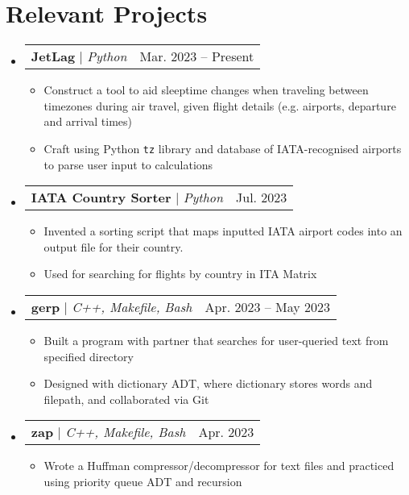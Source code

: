 \documentclass[letterpaper,11pt]{article}
\makeatletter
\newcommand{\resumeItem}[1]{
  \item\small{
    {#1 \vspace{-2pt}}
  }
}
\newcommand{\resumeProjectHeading}[2]{
    \item
    \begin{tabular*}{0.97\textwidth}{l@{\extracolsep{\fill}}r}
      \small#1 & #2 \\
    \end{tabular*}\vspace{-7pt}
}
\newcommand{\resumeSubHeadingListStart}{\begin{itemize}[leftmargin=0in, label={}]}
\newcommand{\resumeSubHeadingListEnd}{\end{itemize}}
\newcommand{\resumeItemListStart}{\begin{itemize}}
\newcommand{\resumeItemListEnd}{\end{itemize}\vspace{-5pt}}
\makeatother
\begin{document}
\section{Relevant Projects}
    \resumeSubHeadingListStart
    \resumeProjectHeading
          {\textbf{JetLag} $|$ \emph{Python}}{Mar. 2023 – Present}
          \resumeItemListStart
            \resumeItem{Construct a tool to aid sleeptime changes when traveling between timezones during air travel,
            given flight details (e.g. airports, departure and arrival
            times)}
            \resumeItem{Craft using Python \texttt{tz} library and database of IATA-recognised airports to parse user input to calculations}
          \resumeItemListEnd
      \resumeProjectHeading
          {\textbf{IATA Country Sorter} $|$ \emph{Python}}{Jul. 2023}
          \resumeItemListStart
            \resumeItem{Invented a sorting script that maps inputted IATA airport codes into an output file for their country.}
            \resumeItem{Used for searching for flights by country in ITA Matrix}
          \resumeItemListEnd
      \resumeProjectHeading
          {\textbf{gerp} $|$ \emph{C++, Makefile, Bash}}{Apr. 2023 – May 2023}
          \resumeItemListStart
            \resumeItem{Built a program with partner that searches for user-queried text from specified directory}
            \resumeItem{Designed with dictionary ADT, where dictionary stores words and filepath, and collaborated via Git}
          \resumeItemListEnd
          \resumeProjectHeading
          {\textbf{zap} $|$ \emph{C++, Makefile, Bash}}{Apr. 2023}
          \resumeItemListStart
          \resumeItem{Wrote a Huffman compressor/decompressor for text files and practiced using priority queue ADT and recursion}
          \resumeItemListEnd
    \resumeSubHeadingListEnd
\end{document}
